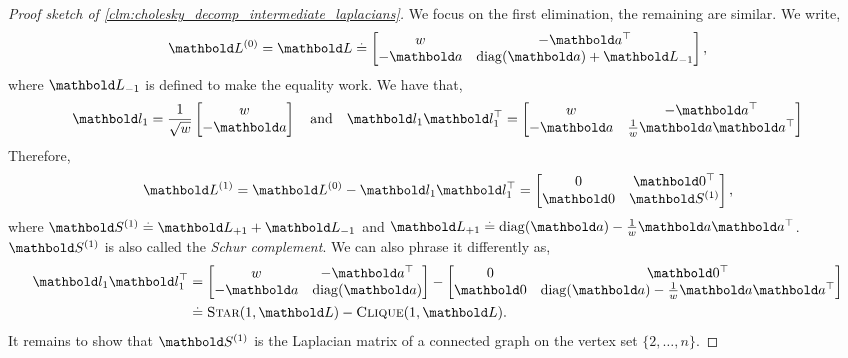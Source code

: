 \begin{proof}[Proof sketch of \cref{clm:cholesky_decomp_intermediate_laplacians}] We focus on the first elimination, the remaining are similar. We write, \begin{align*}
    \mL^{(0)} = \mL \eqdef \begin{bmatrix}
        w & -\trans{\va} \\
        -\va & \diag(\va) + \mL_{-1} \\
    \end{bmatrix},
\end{align*} where $\mL_{-1}$ is defined to make the equality work. We have that, \begin{align*}
    \vl_1 = \frac{1}{\sqrt{w}}\begin{bmatrix}
        w \\
        -\va \\
    \end{bmatrix} \quad\text{and}\quad \vl_1 \trans{\vl_1} = \begin{bmatrix}
        w & -\trans{\va} \\
        -\va & \frac{1}{w}\va\trans{\va} \\
    \end{bmatrix}
\end{align*} Therefore, \begin{align*}
    \mL^{(1)} = \mL^{(0)} - \vl_1 \trans{\vl_1} = \begin{bmatrix}
        0 & \trans{\vZero} \\
        \vZero & \mS^{(1)} \\
    \end{bmatrix},
\end{align*} where $\mS^{(1)} \defeq \mL_{+1} + \mL_{-1}$ and $\mL_{+1} \defeq \diag(\va) - \frac{1}{w}\va\trans{\va}$. $\mS^{(1)}$ is also called the \emph{Schur complement}. We can also phrase it differently as, \begin{align}
    \vl_1 \trans{\vl_1} &= \begin{bmatrix}
        w & -\trans{\va} \\
        -\va & \diag(\va) \\
    \end{bmatrix} - \begin{bmatrix}
        0 & \trans{\vZero} \\
        \vZero & \diag(\va) - \frac{1}{w}\va\trans{\va} \\
    \end{bmatrix} \\
    &\eqdef \textsc{Star}(1, \mL) - \textsc{Clique}(1, \mL).
\end{align} It remains to show that $\mS^{(1)}$ is the Laplacian matrix of a connected graph on the vertex set $\{2, \dots, n\}$.


\end{proof}
